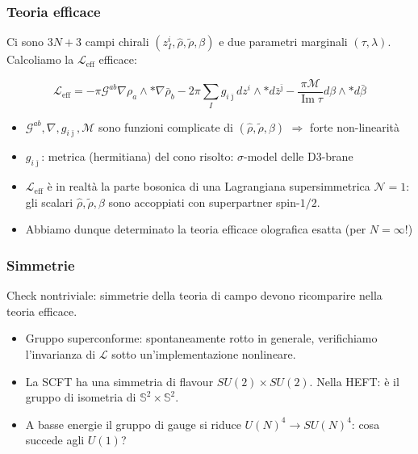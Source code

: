 \documentclass[aspectratio=43,mathserif]{beamer}
\newcommand{\ess}{\mathbb{S}}
\newcommand{\ssn}{\mathcal{N}}
\newcommand{\hatt}[1]{\ensuremath{\widehat{#1}}}
\newcommand{\tildd}[1]{\ensuremath{\widetilde{#1}}}
\newcommand{\hodge}{\ensuremath{*}}
\renewcommand{\Im}{\ensuremath{\operatorname{Im}}}
\newcommand{\leff}{\ensuremath{\mathcal{L}_\text{eff}}}
\begin{document}
\begin{frame}
	\frametitle{Teoria efficace}
	Ci sono $3N+3$ campi chirali $(z_I^i, \hatt\rho, \tildd\rho, \beta)$ e due parametri marginali $(\tau,\lambda)$. Calcoliamo la $\leff$ efficace:

	\begin{equation}
		\leff = - \pi \mathcal{G}^{ab} \nabla \rho_a \wedge \hodge \nabla \bar\rho_b - 2\pi \sum_I g_{i\bar\jmath} dz^i \wedge \hodge d\bar z^{\bar\jmath} - \frac{\pi\mathcal{M}}{\Im \tau} d\beta \wedge \hodge d\bar \beta
		\label{}
	\end{equation}

	\begin{itemize}
		\item $\mathcal{G}^{ab},\nabla,g_{i\bar\jmath},\mathcal{M}$ sono funzioni complicate di $(\hatt\rho,\tildd\rho,\beta)$ $\Longrightarrow$ forte non-linearità
		\item $g_{i\bar\jmath}$: metrica (hermitiana) del cono risolto: $\sigma$-model delle D3-brane
		\item $\leff$ è in realtà la parte bosonica di una Lagrangiana supersimmetrica $\ssn=1$: gli scalari $\hatt\rho,\tildd\rho,\beta$ sono accoppiati con superpartner spin-$1/2$.
		\item Abbiamo dunque determinato la teoria efficace olografica esatta (per $N = \infty$!)
	\end{itemize}



\end{frame}


\begin{frame}
	\frametitle{Simmetrie}
	Check nontriviale: simmetrie della teoria di campo devono ricomparire nella teoria efficace. 
	\begin{itemize}
		\vfill\item Gruppo superconforme: spontaneamente rotto in generale, verifichiamo l'invarianza di $\mathcal{L}$ sotto un'implementazione nonlineare.
		\vfill\item La SCFT ha una simmetria di flavour $SU(2)\times SU(2)$. Nella HEFT: è il gruppo di isometria di $\ess^2 \times \ess^2$.
		\vfill\item A basse energie il gruppo di gauge si riduce $U(N)^4 \rightarrow SU(N)^4$: cosa succede agli $U(1)$?
	\end{itemize}
\end{frame}
\end{document}
